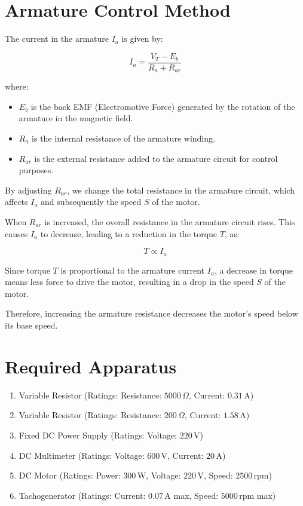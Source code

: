 \documentclass[a4paper,12pt]{article}
\begin{document}
	\section*{Armature Control Method}
	
	The current in the armature \( I_a \) is given by:
	
	\[
	I_a = \frac{V_T - E_b}{R_a + R_{ar}}
	\]
	
	where:
	\begin{itemize}
		\item \( E_b \) is the back EMF (Electromotive Force) generated by the rotation of the armature in the magnetic field.
		\item \( R_a \) is the internal resistance of the armature winding.
		\item \( R_{ar} \) is the external resistance added to the armature circuit for control purposes.
	\end{itemize}
	
	By adjusting \( R_{ar} \), we change the total resistance in the armature circuit, which affects \( I_a \) and subsequently the speed \( S \) of the motor.
	

	When \( R_{ar} \) is increased, the overall resistance in the armature circuit rises. This causes \( I_a \) to decrease, leading to a reduction in the torque \( T \), as:
	
	\[
	T \propto I_a
	\]
	
	Since torque \( T \) is proportional to the armature current \( I_a \), a decrease in torque means less force to drive the motor, resulting in a drop in the speed \( S \) of the motor.
	
	Therefore, increasing the armature resistance decreases the motor’s speed below its base speed.
	
	
	\newpage
	
	
	
	
	\section{Required Apparatus}
	\begin{enumerate}
		\item Variable Resistor (Ratings: Resistance: \( 5000 \, \Omega \), Current: \( 0.31 \, \text{A} \))
		\item Variable Resistor (Ratings: Resistance: \( 200 \, \Omega \), Current: \( 1.58 \, \text{A} \))
		\item Fixed DC Power Supply (Ratings: Voltage: \( 220 \, \text{V} \))
		\item DC Multimeter (Ratings: Voltage: \( 600 \, \text{V} \), Current: \( 20 \, \text{A} \))
	
		\item DC Motor (Ratings: Power: \( 300 \, \text{W} \), Voltage: \( 220 \, \text{V} \), Speed: \( 2500 \, \text{rpm} \))
		\item Tachogenerator (Ratings: Current: \( 0.07 \, \text{A} \) max, Speed: \( 5000 \, \text{rpm} \) max)
	\end{enumerate}
	
\end{document}
